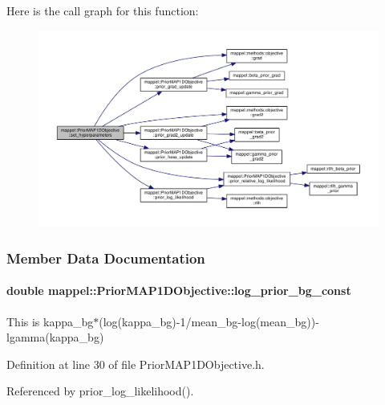 Here is the call graph for this function\+:\nopagebreak
\begin{figure}[H]
\begin{center}
\leavevmode
\includegraphics[width=350pt]{classmappel_1_1PriorMAP1DObjective_ac5b20bb93fe2f2eddd75d19bf34283c7_cgraph}
\end{center}
\end{figure}




\subsubsection{Member Data Documentation}
\paragraph[{\texorpdfstring{log\+\_\+prior\+\_\+bg\+\_\+const}{log_prior_bg_const}}]{\setlength{\rightskip}{0pt plus 5cm}double mappel\+::\+Prior\+M\+A\+P1\+D\+Objective\+::log\+\_\+prior\+\_\+bg\+\_\+const\hspace{0.3cm}{\ttfamily [protected]}}\hypertarget{classmappel_1_1PriorMAP1DObjective_a101d01f84012e41cdd864d04a8dfc38f}{}\label{classmappel_1_1PriorMAP1DObjective_a101d01f84012e41cdd864d04a8dfc38f}
This is kappa\+\_\+bg$\ast$(log(kappa\+\_\+bg)-\/1/mean\+\_\+bg-\/log(mean\+\_\+bg))-\/lgamma(kappa\+\_\+bg) 

Definition at line 30 of file Prior\+M\+A\+P1\+D\+Objective.\+h.



Referenced by prior\+\_\+log\+\_\+likelihood().

